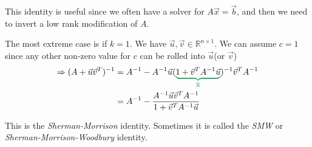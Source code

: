This identity is useful since we often have a solver for $A\Vec{x}=\Vec{b}$, and
then we need to invert a low rank modification of $A$.

The most extreme case is if $k=1$. We have $\Vec{u}, \Vec{v} \in \mathbb{R}^{n \times 1}$.
We can assume $c=1$ since any other non-zero value for $c$ can be rolled into
$\Vec{u}$(or $\Vec{v}$)
\begin{align*}
  \Rightarrow(A+\Vec{u}\Vec{v}^T)^{-1} &= A^{-1} - A^{-1}\Vec{u}(\textcolor{ForestGreen}{ \underbrace{\color{black}1 + \Vec{v}^TA^{-1}\Vec{u}}_{\mathbb{R}}})^{-1}\Vec{v}^TA^{-1}\\
                                       &=A^{-1} - \frac{A^{-1}\Vec{u}\Vec{v}^TA^{-1}}{1 + \Vec{v}^TA^{-1}\Vec{u}}
\end{align*}


This is the \emph{Sherman-Morrison} identity. Sometimes it is called the
\emph{SMW} or \emph{Sherman-Morrison-Woodbury} identity.

